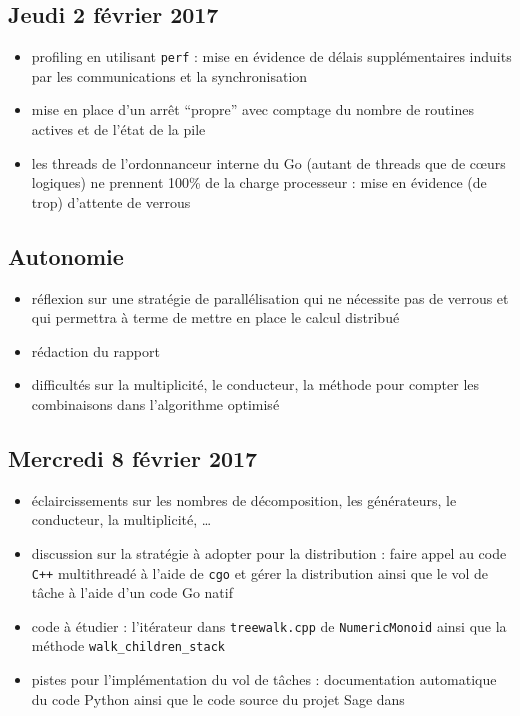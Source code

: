 \documentclass[12pt,a4paper]{article}
\begin{document}
\subsection*{Jeudi 2 février 2017}
\begin{itemize}
	\item	profiling en utilisant \verb|perf| : mise en évidence de délais supplémentaires induits par les communications et la synchronisation
	\item	mise en place d'un arrêt ``propre'' avec comptage du nombre de routines actives et de l'état de la pile
	\item	les threads de l'ordonnanceur interne du Go (autant de threads que de cœurs logiques) ne prennent 100\% de la charge processeur : mise en évidence (de trop) d'attente de verrous
\end{itemize}

\subsection*{Autonomie}
\begin{itemize}
	\item	réflexion sur une stratégie de parallélisation qui ne nécessite pas de verrous et qui permettra à terme de mettre en place le calcul distribué
	\item	rédaction du rapport
	\item	difficultés sur la multiplicité, le conducteur, la méthode pour compter les combinaisons dans l'algorithme optimisé
\end{itemize}

\subsection*{Mercredi 8 février 2017}
\begin{itemize}
	\item	éclaircissements sur les nombres de décomposition, les générateurs, le conducteur, la multiplicité, \dots
	\item	discussion sur la stratégie à adopter pour la distribution : faire appel au code \texttt{C++} multithreadé à l'aide de \texttt{cgo} et gérer la distribution ainsi que le vol de tâche à l'aide d'un code Go natif
	\item	code à étudier : l'itérateur dans \texttt{treewalk.cpp} de \texttt{NumericMonoid} ainsi que la méthode \texttt{walk\_children\_stack}
	\item	pistes pour l'implémentation du vol de tâches : documentation automatique du code Python ainsi que le code source du projet Sage dans 
\end{itemize}
\end{document}
